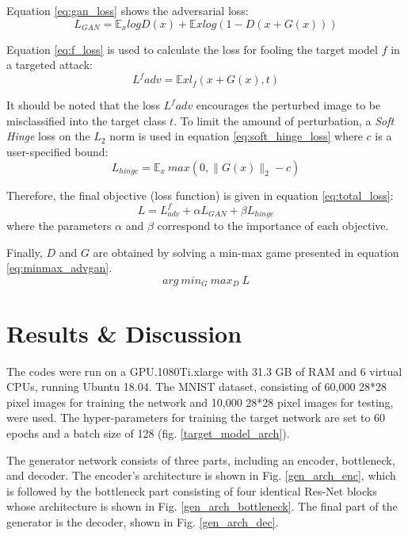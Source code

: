 \documentclass[lettersize,journal]{IEEEtran}
\begin{document}
Equation \ref{eq:gan_loss} shows the adversarial loss:
\begin{equation} \label{eq:gan_loss}
L_{GAN} = \mathbb{E}_x log D(x) + \mathbb{E}x log (1- D(x + G(x)))
\end{equation}

Equation \ref{eq:f_loss} is used to calculate the loss for fooling the target model $f$ in a targeted attack:
\begin{equation} \label{eq:f_loss}
L^f{adv} = \mathbb{E}x l_f(x + G(x), t)
\end{equation}

It should be noted that the loss $L^f{adv}$ encourages the perturbed image to be misclassified into the target class $t$.
To limit the amound of perturbation, a \textit{Soft Hinge} loss on the $L_2$ norm is used in equation \ref{eq:soft_hinge_loss} where $c$ is a user-specified bound:
\begin{equation} \label{eq:soft_hinge_loss}
L_{hinge} = \mathbb{E}_x\:max(0, \|G(x)\|_2 - c)
\end{equation}

Therefore, the final objective (loss function) is given in equation \ref{eq:total_loss}:
\begin{equation} \label{eq:total_loss}
L = L^f_{adv} + \alpha L_{GAN} + \beta L_{hinge}
\end{equation}
where the parameters $\alpha$ and $\beta$ correspond to the importance of each objective.

Finally, $D$ and $G$ are obtained by solving a min-max game presented in equation \ref{eq:minmax_advgan}.
\begin{equation} \label{eq:minmax_advgan}
arg\:min_G\:max_D\:L
\end{equation}

\section{Results \& Discussion}
The codes were run on a GPU.1080Ti.xlarge with 31.3 GB of RAM and 6 virtual CPUs, running Ubuntu 18.04. The MNIST dataset, consisting of 60,000 28*28 pixel images for training the network and 10,000 28*28 pixel images for testing, were used. The hyper-parameters for training the target network are set to 60 epochs and a batch size of 128 (fig. \ref{target_model_arch}).

The generator network consists of three parts, including an encoder, bottleneck, and decoder. The encoder's architecture is shown in Fig. \ref{gen_arch_enc}, which is followed by the bottleneck part consisting of four identical Res-Net blocks whose architecture is shown in Fig. \ref{gen_arch_bottleneck}. The final part of the generator is the decoder, shown in Fig. \ref{gen_arch_dec}. 
\end{document}
